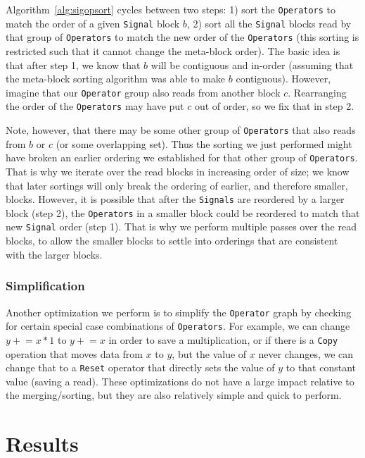 \documentclass{article}
\begin{document}
Algorithm~\ref{alg:sigopsort} cycles between two steps: 1) sort the \texttt{Operators} to match the order of a given \texttt{Signal} block $b$, 2) sort all the \texttt{Signal} blocks read by that group of \texttt{Operators} to match the new order of the \texttt{Operators} (this sorting is restricted such that it cannot change the meta-block order).  The basic idea is that after step 1, we know that $b$ will be contiguous and in-order (assuming that the meta-block sorting algorithm was able to make $b$ contiguous).  However, imagine that our \texttt{Operator} group also reads from another block $c$.  Rearranging the order of the \texttt{Operators} may have put $c$ out of order, so we fix that in step 2.  

Note, however, that there may be some other group of \texttt{Operators} that also reads from $b$ or $c$ (or some overlapping set).  Thus the sorting we just performed might have broken an earlier ordering we established for that other group of \texttt{Operators}.  That is why we iterate over the read blocks in increasing order of size; we know that later sortings will only break the ordering of earlier, and therefore smaller, blocks.  However, it is possible that after the \texttt{Signals} are reordered by a larger block (step 2), the \texttt{Operators} in a smaller block could be reordered to match that new \texttt{Signal} order (step 1).  That is why we perform multiple passes over the read blocks, to allow the smaller blocks to settle into orderings that are consistent with the larger blocks.

\subsubsection{Simplification}

Another optimization we perform is to simplify the \texttt{Operator} graph by checking for certain special case combinations of \texttt{Operators}.  For example, we can change $y\mathrel{+}=x*1$ to $y\mathrel{+}=x$ in order to save a multiplication, or if there is a \texttt{Copy} operation that moves data from $x$ to $y$, but the value of $x$ never changes, we can change that to a \texttt{Reset} operator that directly sets the value of $y$ to that constant value (saving a read).  These optimizations do not have a large impact relative to the merging/sorting, but they are also relatively simple and quick to perform.

\section{Results}
\label{sec:results}
\end{document}
